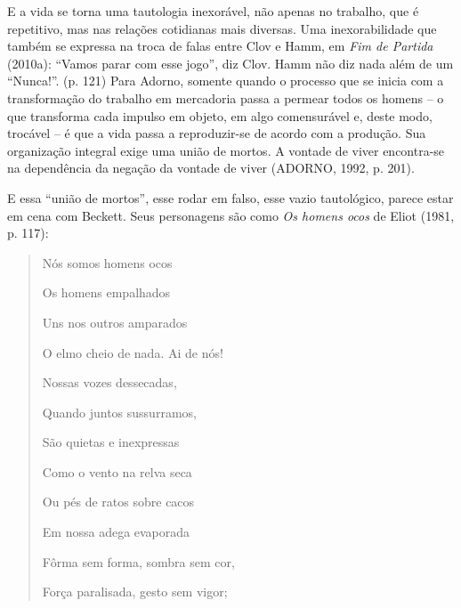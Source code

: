 E a vida se torna uma tautologia inexorável, não apenas no trabalho, que
é repetitivo, mas nas relações cotidianas mais diversas. Uma
inexorabilidade que também se expressa na troca de falas entre Clov e
Hamm, em \emph{Fim de Partida} (2010a): ``Vamos parar com esse jogo'',
diz Clov. Hamm não diz nada além de um ``Nunca!''. (p. 121) Para Adorno,
somente quando o processo que se inicia com a transformação do trabalho
em mercadoria passa a permear todos os homens -- o que transforma cada
impulso em objeto, em algo comensurável e, deste modo, trocável -- é que
a vida passa a reproduzir-se de acordo com a produção. Sua organização
integral exige uma união de mortos. A vontade de viver encontra-se na
dependência da negação da vontade de viver (ADORNO, 1992, p. 201).

E essa ``união de mortos'', esse rodar em falso, esse vazio tautológico,
parece estar em cena com Beckett. Seus personagens são como \emph{Os
homens ocos} de Eliot (1981, p. 117):

\begin{quote}
Nós somos homens ocos

Os homens empalhados

Uns nos outros amparados

O elmo cheio de nada. Ai de nós!

Nossas vozes dessecadas,

Quando juntos sussurramos,

São quietas e inexpressas

Como o vento na relva seca

Ou pés de ratos sobre cacos

Em nossa adega evaporada

Fôrma sem forma, sombra sem cor,

Força paralisada, gesto sem vigor;
\end{quote}

